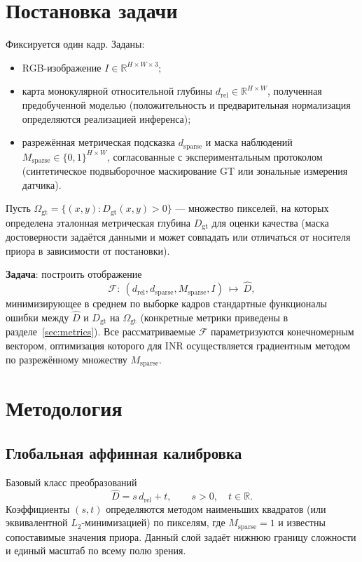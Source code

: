 \documentclass[12pt]{article}
\begin{document}
\section{Постановка задачи}

Фиксируется один кадр. Заданы:
\begin{itemize}
  \item RGB-изображение $I\in\mathbb{R}^{H\times W\times 3}$;
  \item карта монокулярной относительной глубины $d_{\mathrm{rel}}\in\mathbb{R}^{H\times W}$, полученная предобученной моделью (положительность и предварительная нормализация определяются реализацией инференса);
  \item разрежённая метрическая подсказка $d_{\mathrm{sparse}}$ и маска наблюдений $M_{\mathrm{sparse}}\in\{0,1\}^{H\times W}$, согласованные с экспериментальным протоколом (синтетическое подвыборочное маскирование GT или зональные измерения датчика).
\end{itemize}

Пусть $\Omega_{\mathrm{gt}}=\{(x,y): D_{\mathrm{gt}}(x,y)>0\}$ --- множество пикселей, на которых определена эталонная метрическая глубина $D_{\mathrm{gt}}$ для оценки качества (маска достоверности задаётся данными и может совпадать или отличаться от носителя приора в зависимости от постановки).

\textbf{Задача}: построить отображение
\[
  \mathcal{F}:\ (d_{\mathrm{rel}}, d_{\mathrm{sparse}}, M_{\mathrm{sparse}}, I)\ \mapsto\ \hat D,
\]
минимизирующее в среднем по выборке кадров стандартные функционалы ошибки между $\hat D$ и $D_{\mathrm{gt}}$ на $\Omega_{\mathrm{gt}}$ (конкретные метрики приведены в разделе~\ref{sec:metrics}). Все рассматриваемые $\mathcal{F}$ параметризуются конечномерным вектором, оптимизация которого для INR осуществляется градиентным методом по разрежённому множеству $M_{\mathrm{sparse}}$.

\section{Методология}

\subsection{Глобальная аффинная калибровка}

Базовый класс преобразований
\[
  \hat D = s\, d_{\mathrm{rel}} + t,\qquad s>0,\quad t\in\mathbb{R}.
\]
Коэффициенты $(s,t)$ определяются методом наименьших квадратов (или эквивалентной $L_2$-минимизацией) по пикселям, где $M_{\mathrm{sparse}}=1$ и известны сопоставимые значения приора. Данный слой задаёт нижнюю границу сложности и единый масштаб по всему полю зрения.
\end{document}
